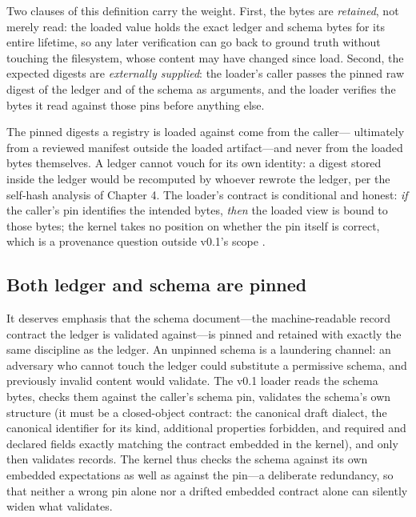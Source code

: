 Two clauses of this definition carry the weight. First, the bytes are
\emph{retained}, not merely read: the loaded value holds the exact ledger
and schema bytes for its entire lifetime, so any later verification can go
back to ground truth without touching the filesystem, whose content may
have changed since load. Second, the expected digests are
\emph{externally supplied}: the loader's caller passes the pinned raw
digest of the ledger and of the schema as arguments, and the loader
verifies the bytes it read against those pins before anything else.

\begin{ruleenv}\label{ch06:rule:pins}
The pinned digests a registry is loaded against come from the caller---
ultimately from a reviewed manifest outside the loaded artifact---and
never from the loaded bytes themselves. A ledger cannot vouch for its own
identity: a digest stored inside the ledger would be recomputed by
whoever rewrote the ledger, per the self-hash analysis of
Chapter 4. The loader's contract is conditional and honest: \emph{if}
the caller's pin identifies the intended bytes, \emph{then} the loaded
view is bound to those bytes; the kernel takes no position on whether the
pin itself is correct, which is a provenance question outside v0.1's
scope \cite{prov}.
\end{ruleenv}

\subsection{Both ledger and schema are pinned}

It deserves emphasis that the schema document---the machine-readable
record contract the ledger is validated against---is pinned and retained
with exactly the same discipline as the ledger. An unpinned schema is a
laundering channel: an adversary who cannot touch the ledger could
substitute a permissive schema, and previously invalid content would
validate. The v0.1 loader reads the schema bytes, checks them against the
caller's schema pin, validates the schema's own structure (it must be a
closed-object contract: the canonical draft dialect, the canonical
identifier for its kind, additional properties forbidden, and required
and declared fields exactly matching the contract embedded in the kernel),
and only then validates records. The kernel thus checks the schema against
its own embedded expectations as well as against the pin---a deliberate
redundancy, so that neither a wrong pin alone nor a drifted embedded
contract alone can silently widen what validates.

